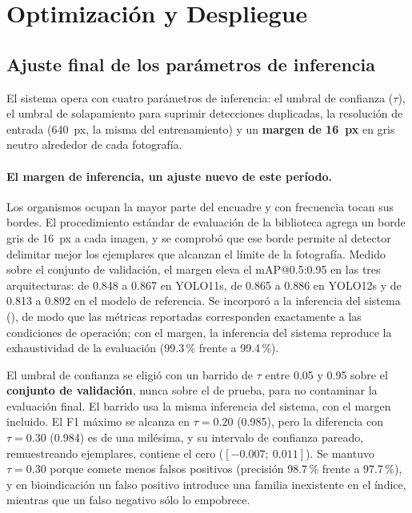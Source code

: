 \documentclass[onecolumn]{article}
\begin{document}
\section{Optimización y Despliegue}

\subsection{Ajuste final de los parámetros de inferencia}

El sistema opera con cuatro parámetros de inferencia: el umbral de confianza ($\tau$), el umbral de solapamiento para suprimir detecciones duplicadas, la resolución de entrada (640~px, la misma del entrenamiento) y un \textbf{margen de 16~px} en gris neutro alrededor de cada fotografía.

\paragraph{El margen de inferencia, un ajuste nuevo de este período.} Los organismos ocupan la mayor parte del encuadre y con frecuencia tocan sus bordes. El procedimiento estándar de evaluación de la biblioteca agrega un borde gris de 16~px a cada imagen, y se comprobó que ese borde permite al detector delimitar mejor los ejemplares que alcanzan el límite de la fotografía. Medido sobre el conjunto de validación, el margen eleva el mAP@0.5:0.95 en las tres arquitecturas: de 0.848 a 0.867 en YOLO11s, de 0.865 a 0.886 en YOLO12s y de 0.813 a 0.892 en el modelo de referencia. Se incorporó a la inferencia del sistema (), de modo que las métricas reportadas corresponden exactamente a las condiciones de operación; con el margen, la inferencia del sistema reproduce la exhaustividad de la evaluación (99.3\,\% frente a 99.4\,\%).

El umbral de confianza se eligió con un barrido de $\tau$ entre 0.05 y 0.95 sobre el \textbf{conjunto de validación}, nunca sobre el de prueba, para no contaminar la evaluación final. El barrido usa la misma inferencia del sistema, con el margen incluido. El F1 máximo se alcanza en $\tau=0.20$ (0.985), pero la diferencia con $\tau=0.30$ (0.984) es de una milésima, y su intervalo de confianza pareado, remuestreando ejemplares, contiene el cero ($[-0.007;\ 0.011]$). Se mantuvo $\tau=0.30$ porque comete menos falsos positivos (precisión 98.7\,\% frente a 97.7\,\%), y en bioindicación un falso positivo introduce una familia inexistente en el índice, mientras que un falso negativo sólo lo empobrece.
\end{document}
